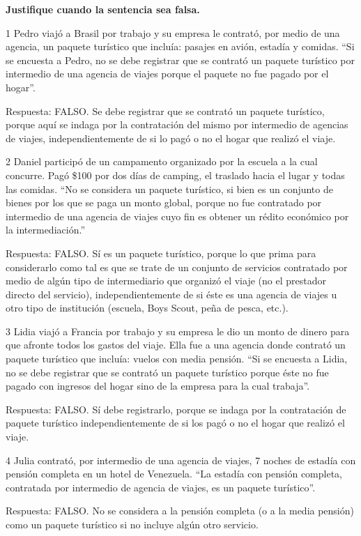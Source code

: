 \documentclass[
  openany]{book}
\begin{document}
\textbf{Justifique cuando la sentencia sea falsa.}

1 Pedro viajó a Brasil por trabajo y su empresa le contrató, por medio de una agencia, un paquete turístico que incluía: pasajes en avión, estadía y comidas.
``Si se encuesta a Pedro, no se debe registrar que se contrató un paquete turístico por intermedio de una agencia de viajes porque el paquete no fue pagado por el hogar''.

Respuesta: FALSO. Se debe registrar que se contrató un paquete turístico, porque aquí se indaga por la contratación del mismo por intermedio de agencias de viajes, independientemente de si lo pagó o no el hogar que realizó el viaje.

2 Daniel participó de un campamento organizado por la escuela a la cual concurre. Pagó \$100 por dos días de camping, el traslado hacia el lugar y todas las comidas. ``No se considera un paquete turístico, si bien es un conjunto de bienes por los que se paga un monto global, porque no fue contratado por intermedio de una agencia de viajes cuyo fin es obtener un rédito económico por la intermediación.''

Respuesta: FALSO. Sí es un paquete turístico, porque lo que prima para considerarlo como tal es que se trate de un conjunto de servicios contratado por medio de algún tipo de intermediario que organizó el viaje (no el prestador directo del servicio), independientemente de si éste es una agencia de viajes u otro tipo de institución (escuela, Boys Scout, peña de pesca, etc.).

3 Lidia viajó a Francia por trabajo y su empresa le dio un monto de dinero para que afronte todos los gastos del viaje. Ella fue a una agencia donde contrató un paquete turístico que incluía: vuelos con media pensión.
``Si se encuesta a Lidia, no se debe registrar que se contrató un paquete turístico porque éste no fue pagado con ingresos del hogar sino de la empresa para la cual trabaja''.

Respuesta: FALSO. Sí debe registrarlo, porque se indaga por la contratación de paquete turístico independientemente de si los pagó o no el hogar que realizó el viaje.

4 Julia contrató, por intermedio de una agencia de viajes, 7 noches de estadía con pensión completa en un hotel de Venezuela.
``La estadía con pensión completa, contratada por intermedio de agencia de viajes, es un paquete turístico''.

Respuesta: FALSO. No se considera a la pensión completa (o a la media pensión) como un paquete turístico si no incluye algún otro servicio.
\end{document}

